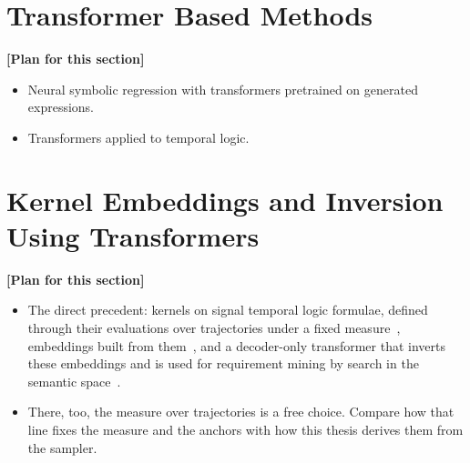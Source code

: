 \documentclass[titlepage,a4paper,11pt]{report}
\newenvironment{RSplan}{\par\medskip\color{orange!85!black}\noindent\textbf{[Plan for this section]}\par}{\par\medskip}
\begin{document}
    \section{Transformer Based Methods}
    \begin{RSplan}
    \begin{itemize}
        \item Neural symbolic regression with transformers pretrained on generated expressions.
        \item Transformers applied to temporal logic.
    \end{itemize}
    \end{RSplan}

    \section{Kernel Embeddings and Inversion Using Transformers}\label{sec:Kernel_Embeddings_and_Inversion}
    \begin{RSplan}
    \begin{itemize}
        \item The direct precedent: kernels on signal temporal logic formulae, defined through their evaluations over trajectories under a fixed measure~\cite{bortolussi_kernel_2020,bortolussi_learning_2022}, embeddings built from them~\cite{saveri_stl2vec_2024}, and a decoder-only transformer that inverts these embeddings and is used for requirement mining by search in the semantic space~\cite{candussio_bridging_2025}.
        \item There, too, the measure over trajectories is a free choice. Compare how that line fixes the measure and the anchors with how this thesis derives them from the sampler.
    \end{itemize}
    \end{RSplan}
\end{document}

